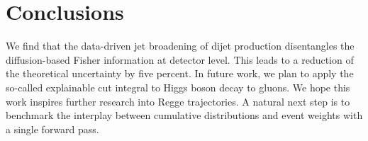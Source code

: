 \section{Conclusions}\label{sec:conclusions}

We find that the data-driven jet broadening of dijet production
disentangles the diffusion-based Fisher information at detector level.
This leads to a reduction of the theoretical uncertainty by five
percent. In future work, we plan to apply the so-called explainable cut
integral to Higgs boson decay to gluons. We hope this work inspires
further research into Regge trajectories. A natural next step is to
benchmark the interplay between cumulative distributions and event
weights with a single forward pass.

